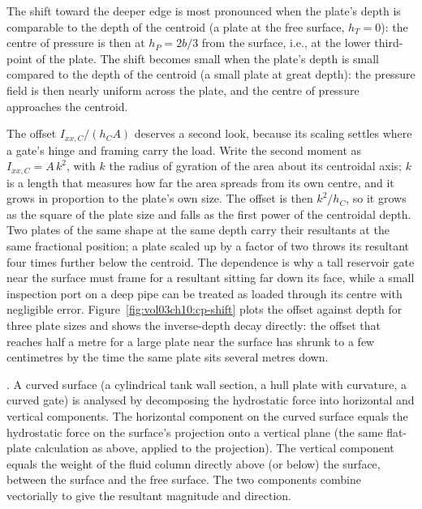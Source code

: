 The shift toward the deeper edge is most pronounced when the
plate's depth is comparable to the depth of the centroid (a
plate at the free surface, $h_T = 0$): the centre of pressure
is then at $h_P = 2b/3$ from the surface, i.e., at the lower
third-point of the plate. The shift becomes small when the
plate's depth is small compared to the depth of the centroid (a
small plate at great depth): the pressure field is then nearly
uniform across the plate, and the centre of pressure approaches
the centroid.

The offset $I_{xx,C}/(h_C A)$ deserves a second look, because its
scaling settles where a gate's hinge and framing carry the load. Write
the second moment as $I_{xx,C} = A\,k^2$, with $k$ the radius of
gyration of the area about its centroidal axis; $k$ is a length that
measures how far the area spreads from its own centre, and it grows in
proportion to the plate's own size. The offset is then $k^2/h_C$, so it
grows as the square of the plate size and falls as the first power of the
centroidal depth. Two plates of the same shape at the same depth carry
their resultants at the same fractional position; a plate scaled up by a
factor of two throws its resultant four times further below the centroid.
The dependence is why a tall reservoir gate near the surface must frame
for a resultant sitting far down its face, while a small inspection port
on a deep pipe can be treated as loaded through its centre with negligible
error. Figure~\ref{fig:vol03ch10:cp-shift} plots the offset against depth
for three plate sizes and shows the inverse-depth decay directly: the
offset that reaches half a metre for a large plate near the surface has
shrunk to a few centimetres by the time the same plate sits several metres
down.



. A
curved surface (a cylindrical tank wall section, a hull plate
with curvature, a curved gate) is analysed by decomposing the
hydrostatic force into horizontal and vertical components. The
horizontal component on the curved surface equals the
hydrostatic force on the surface's projection onto a vertical
plane (the same flat-plate calculation as above, applied to the
projection). The vertical component equals the weight of the
fluid column directly above (or below) the surface, between the
surface and the free surface. The two components combine
vectorially to give the resultant magnitude and direction.


